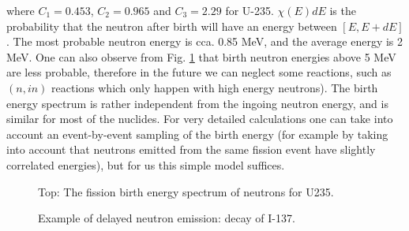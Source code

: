 \noindent where   $C_1 = 0.453$, $C_2 = 0.965$ and $C_3 = 2.29$ for U-235. $\chi(E)dE$ is the probability that the neutron after birth will have an energy between $[E,E+dE]$. The most probable neutron energy is cca. 0.85 MeV, and the average energy is 2 MeV. One can also observe from Fig. \ref{fig:watt} that birth neutron energies above 5 MeV are less probable, therefore in the future we can neglect some reactions, such as $(n,\textit{i}n)$ reactions which only happen with high energy neutrons). The birth energy spectrum is rather independent from the ingoing neutron energy, and is similar for most of the nuclides. For very detailed calculations one can take into account an event-by-event sampling of the birth energy (for example by taking into account that neutrons emitted from the same fission event have slightly correlated energies), but for us this simple model suffices. 

\begin{figure}[ht!]
\protect {}\protect
\caption{\label{fig:watt} \footnotesize{Top: The fission birth energy spectrum of neutrons for U235.}}
\end{figure}

\begin{figure}[ht!]
\protect {}\protect
\caption{\label{fig:delayedexample} \footnotesize{Example of delayed neutron emission: decay of I-137.}}
\end{figure}

